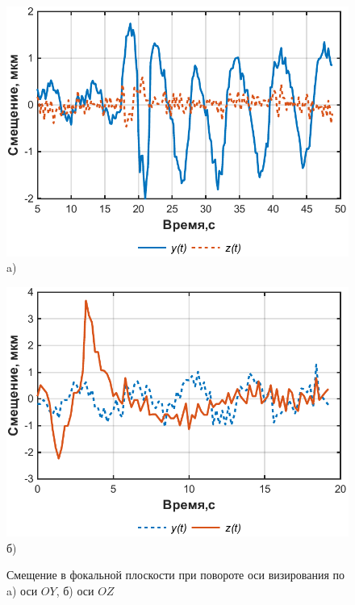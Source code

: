 \begin{figure}[ht]
	\begin{minipage}[b][][b]{0.49\linewidth}\centering
		\includegraphics[width=1\linewidth]{matlab/img/biasY.pdf} \\ a)
	\end{minipage}
	\hfill
	\begin{minipage}[b][][b]{0.49\linewidth}\centering
		\includegraphics[width=1\linewidth]{matlab/img/biasZ.pdf} \\ б)
	\end{minipage}
	\caption{Смещение в фокальной плоскости при повороте оси визирования по a) оси $OY$, б) оси $OZ$ }
	\label{fig:bias}
\end{figure}


